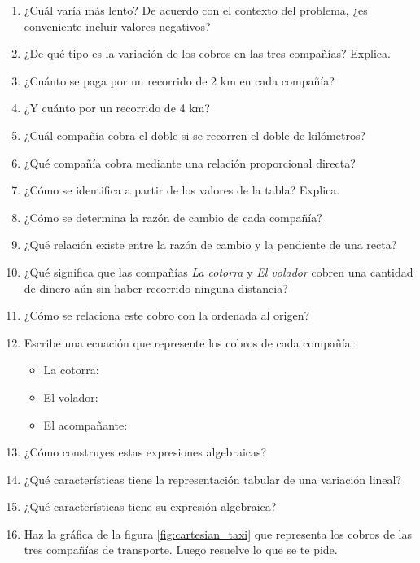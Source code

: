 \documentclass[11pt]{book}
\begin{document}
\begin{enumerate}
\begin{enumerate}
          \item ¿Cuál varía más lento? De acuerdo con el contexto del problema, ¿es conveniente
                incluir valores negativos?
          \item ¿De qué tipo es la variación de los cobros en las tres compañías? Explica.
          \item ¿Cuánto se paga por un recorrido de 2 km en cada compañía?
          \item ¿Y cuánto por un recorrido de 4 km?
          \item ¿Cuál compañía cobra el doble si se recorren el doble de kilómetros?
          \item ¿Qué compañía cobra mediante una relación proporcional directa?
          \item ¿Cómo se identifica a partir de los valores de la tabla? Explica.
          \item ¿Cómo se determina la razón de cambio de cada compañía?
          \item ¿Qué relación existe entre la razón de cambio y la pendiente de una recta?
          \item ¿Qué significa que las compañías \emph{La cotorra} y \emph{El volador} cobren una cantidad de dinero aún sin
                haber recorrido ninguna distancia?
          \item ¿Cómo se relaciona este cobro con la ordenada al origen?
          \item Escribe una ecuación que represente los cobros de cada compañía:
                \begin{itemize}
                  \item La cotorra:
                  \item El volador:
                  \item El acompañante:
                \end{itemize}
          \item ¿Cómo construyes estas expresiones algebraicas?
          \item ¿Qué características tiene la representación tabular de una variación lineal?
          \item ¿Qué características tiene su expresión algebraica?
          \item Haz la gráfica de la figura \ref{fig:cartesian_taxi} que representa los cobros de las tres compañías de transporte. Luego resuelve lo que se te pide.
                \begin{figure}[H]
                  \centering

\end{figure}
\end{enumerate}
\end{enumerate}
\end{document}
